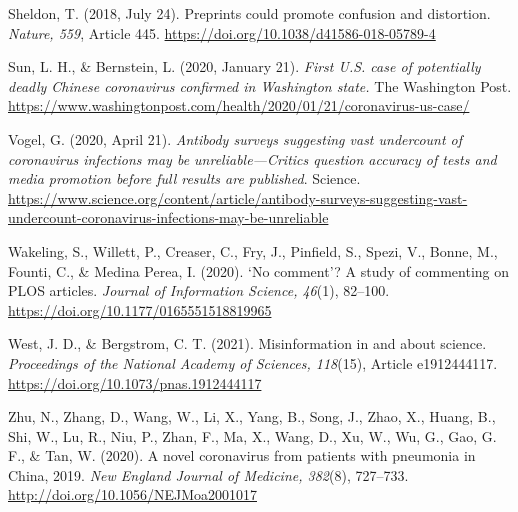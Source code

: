 \documentclass[authordate, perspective]{jote-new-article}
\begin{document}
	Sheldon, T. (2018, July 24). Preprints could promote confusion and distortion. \emph{Nature, 559}, Article 445. \url{https://doi.org/10.1038/d41586-018-05789-4}







	Sun, L. H., \& Bernstein, L. (2020, January 21). \emph{First U.S. case of potentially deadly Chinese coronavirus confirmed in Washington state. }The Washington Post. \url{https://www.washingtonpost.com/health/2020/01/21/coronavirus-us-case/}







	Vogel, G. (2020, April 21). \emph{Antibody surveys suggesting vast undercount of coronavirus infections may be unreliable—Critics question accuracy of tests and media promotion before full results are published}. Science. \url{https://www.science.org/content/article/antibody-surveys-suggesting-vast-undercount-coronavirus-infections-may-be-unreliable}







	Wakeling, S., Willett, P., Creaser, C., Fry, J., Pinfield, S., Spezi, V., Bonne, M., Founti, C., \& Medina Perea, I. (2020). ‘No comment'? A study of commenting on PLOS articles. \emph{Journal of Information Science, 46}(1), 82--100. \url{https://doi.org/10.1177/0165551518819965}







	West, J. D., \& Bergstrom, C. T. (2021). Misinformation in and about science. \emph{Proceedings of the National Academy of Sciences, 118}(15), Article e1912444117. \href{https://doi.org/10.1073/pnas.1912444117}{https://doi.org/10.1073/pnas.1912444117}







	Zhu, N., Zhang, D., Wang, W., Li, X., Yang, B., Song, J., Zhao, X., Huang, B., Shi, W., Lu, R., Niu, P., Zhan, F., Ma, X., Wang, D., Xu, W., Wu, G., Gao, G. F., \& Tan, W. (2020). A novel coronavirus from patients with pneumonia in China, 2019. \emph{New England Journal of Medicine, 382}(8), 727--733. \url{http://doi.org/10.1056/NEJMoa2001017}
\end{document}
